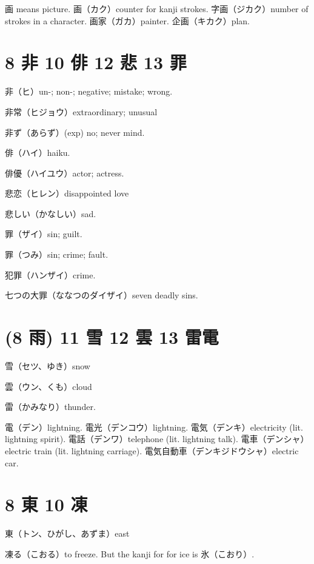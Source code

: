 画 means picture.
画（カク）counter for kanji strokes.
字画（ジカク）number of strokes in a character.
画家（ガカ）painter.
企画（キカク）plan.

\section{8 非 10 俳 12 悲 13 罪}

非（ヒ）un-; non-; negative; mistake; wrong.

非常（ヒジョウ）extraordinary; unusual

非ず（あらず）(exp) no; never mind.

俳（ハイ）haiku.

俳優（ハイユウ）actor; actress.

悲恋（ヒレン）disappointed love

悲しい（かなしい）sad.

罪（ザイ）sin; guilt.

罪（つみ）sin; crime; fault.

犯罪（ハンザイ）crime.

七つの大罪（ななつのダイザイ）seven deadly sins.

\section{(8 雨) 11 雪 12 雲 13 雷電}

雪（セツ、ゆき）snow

雲（ウン、くも）cloud

雷（かみなり）thunder.

電（デン）lightning.
電光（デンコウ）lightning.
電気（デンキ）electricity (lit. lightning spirit).
電話（デンワ）telephone (lit. lightning talk).
電車（デンシャ）electric train (lit. lightning carriage).
電気自動車（デンキジドウシャ）electric car.

\section{8 東 10 凍}

東（トン、ひがし、あずま）east

凍る（こおる）to freeze.
But the kanji for for ice is 氷（こおり）.
